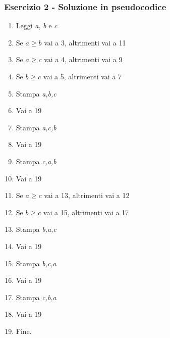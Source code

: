 \documentclass[aspectratio=169]{beamer}
\begin{document}
\begin{frame}
\frametitle{Esercizio 2 - Soluzione in pseudocodice}
\begin{multicols}{2}
\begin{enumerate}
	\item Leggi \emph{a}, \emph{b} e \emph{c}
	\item Se $a \geq b$ vai a 3, altrimenti vai a 11

	\item Se $a \geq c$ vai a 4, altrimenti vai a 9
	\item Se $b \geq c$ vai a 5, altrimenti vai a 7
	\item Stampa \emph{a,b,c}
	\item Vai a 19
	\item Stampa \emph{a,c,b}
	\item Vai a 19
	\item Stampa \emph{c,a,b}
	\item Vai a 19

	\item Se $a \geq c$ vai a 13, altrimenti vai a 12
	\item Se $b \geq c$ vai a 15, altrimenti vai a 17
	\item Stampa \emph{b,a,c}
	\item Vai a 19
	\item Stampa \emph{b,c,a}
	\item Vai a 19
	\item Stampa \emph{c,b,a}
	\item Vai a 19

	\item Fine.
\end{enumerate}
\end{multicols}
\end{frame}
\fi
\end{document}
